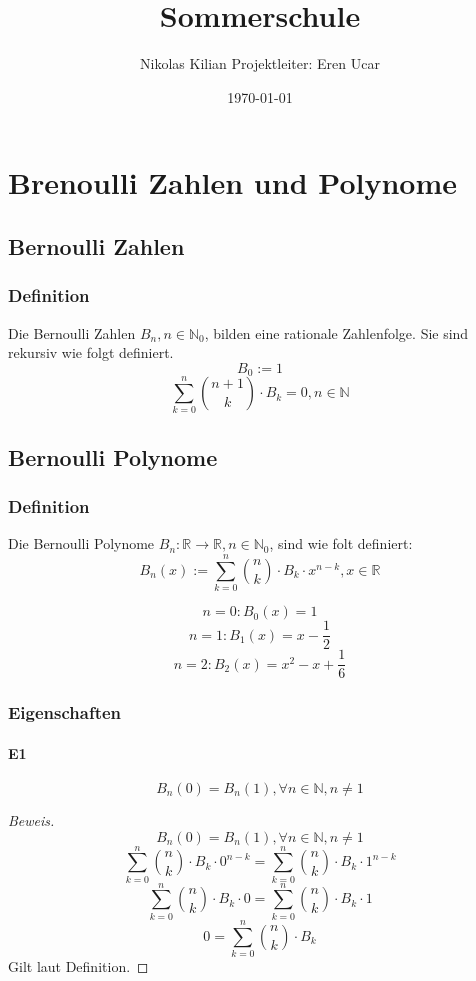 \documentclass[12pt]{article}
\begin{document}
\title{\vspace{-2.0cm}Sommerschule}
\author{Nikolas Kilian
Projektleiter: Eren Ucar}
\date{\today}
\maketitle

\section{Brenoulli Zahlen und Polynome}
\subsection{Bernoulli Zahlen}
\subsubsection{Definition}

Die Bernoulli Zahlen \(B_n, n \in \mathbb{N}_0\), bilden eine rationale Zahlenfolge.
Sie sind rekursiv wie folgt definiert.
\[B_0 := 1\]
\[\sum_{k=0}^n {n+1 \choose k} \cdot B_k = 0, n \in \mathbb{N}\]

\subsection{Bernoulli Polynome}
\subsubsection{Definition}

Die Bernoulli Polynome \(B_n:\mathbb{R}\to\mathbb{R},n\in\mathbb{N}_0\), sind wie folt definiert:
\[B_n(x) := \sum_{k=0}^n {n \choose k} \cdot B_k \cdot x^{n-k}, x\in\mathbb{R}\]

\[n = 0: B_0(x) = 1\]
\[n = 1: B_1(x) = x - \frac{1}{2}\]
\[n = 2: B_2(x) = x^2 - x + \frac{1}{6}\]

\subsubsection{Eigenschaften}
\paragraph{E1} 
\[B_n(0) = B_n(1), \forall n\in\mathbb{N}, n \neq 1\]

\begin{proof}[Beweis]
\[B_n(0) = B_n(1), \forall n\in\mathbb{N}, n \neq 1\]
\[\sum_{k=0}^n {n \choose k} \cdot B_k \cdot 0^{n-k} = \sum_{k=0}^n {n \choose k} \cdot B_k \cdot 1^{n-k}\]
\[\sum_{k=0}^n {n \choose k} \cdot B_k \cdot 0 = \sum_{k=0}^n {n \choose k} \cdot B_k \cdot 1\]
\[0 = \sum_{k=0}^n {n \choose k} \cdot B_k\]
Gilt laut Definition.
\end{proof}
\end{document}
